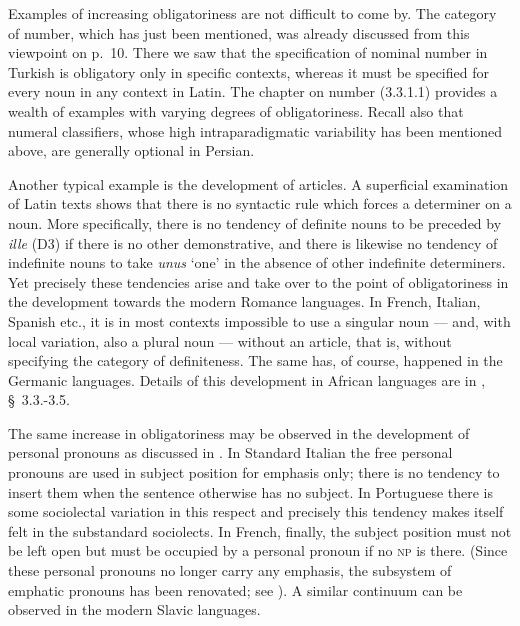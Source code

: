 Examples of increasing obligatoriness are not difficult to come by. The category of number, which has just been mentioned, was already discussed from this viewpoint on p.~10. There we saw that the specification of nominal number in Turkish is obligatory only in specific contexts, whereas it must be specified for every noun in any context in Latin. The chapter on number (3.3.1.1) provides a wealth of examples with varying degrees of obligatoriness. Recall also that numeral classifiers, whose high intraparadigmatic variability has been mentioned above, are generally optional in Persian.

Another typical example is the development of articles. A superficial examination of Latin texts shows that there is no syntactic rule which forces a determiner on a noun. More specifically, there is no tendency of definite nouns to be preceded by \textit{ille} (D3) if there is no other demonstrative, and there is likewise no tendency of indefinite nouns to take \textit{unus} ‘one’ in the absence of other indefinite determiners. Yet precisely these tendencies arise and take over to the point of obligatoriness in the development towards the modern Romance languages. In French, Italian, Spanish etc., it is in most contexts impossible to use a singular noun — and, with local variation, also a plural noun — without an article, that is, without specifying the category of definiteness. The same has, of course, happened in the Germanic languages. Details of this development in African languages are in \citet{Greenberg1978}, §~3.3.-3.5.

The same increase in obligatoriness may be observed in the development of personal pronouns as discussed in . In Standard Italian the free personal pronouns are used in subject position for emphasis only; there is no tendency to insert them when the sentence otherwise has no subject. In Portuguese there is some sociolectal variation in this respect and precisely this tendency makes itself felt in the substandard sociolects. In French, finally, the subject position must not be left open but must be occupied by a personal pronoun if no \textsc{np} is there. (Since these personal pronouns no longer carry any emphasis, the subsystem of emphatic pronouns has been renovated; see ). A similar continuum can be observed in the modern Slavic languages.

